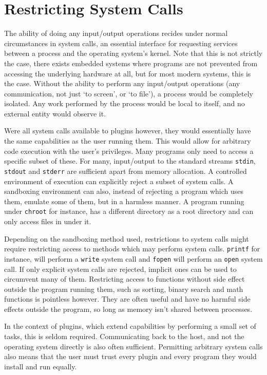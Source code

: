 \section {Restricting System Calls}

The ability of doing any input/output operations recides under normal
circumstances in system calls, an essential interface for requesting services
between a process and the operating system's kernel. Note that this is not
strictly the case, there exists embedded systems where programs are not
prevented from accessing the underlying hardware at all, but for most modern
systems, this is the case. Without the ability to perform any input/output
operations (any communication, not just `to screen', or `to file'), a process
would be completely isolated. Any work performed by the process would be local
to itself, and no external entity would observe it.

Were all system calls available to plugins however, they would essentially
have the same capabilities as the user running them. This would allow for
arbitrary code execution with the user's privileges. Many programs only need to
access a specific subset of these. For many, input/output to the standard
streams \texttt{stdin}, \texttt{stdout} and \texttt{stderr} are sufficient apart
from memory allocation. A controlled environment of execution can explicitly
reject a subset of system calls. A sandboxing environment can also, instead of
rejecting a program which uses them, emulate some of them, but in a harmless
manner. A program running under \texttt{chroot} for instance, has a different
directory as a root directory and can only access files in under it.

Depending on the sandboxing method used, restrictions to system calls might
require restricting access to methods which may perform system calls.
\texttt{printf} for instance, will perform a \texttt{write} system call and
\texttt{fopen} will perform an \texttt{open} system call. If only explicit
system calls are rejected, implicit ones can be used to circumvent many of them.
Restricting access to functions without side effect outside the program running
them, such as sorting, binary search and math functions is pointless however.
They are often useful and have no harmful side effects outside the program, so
long as memory isn't shared between processes.

In the context of plugins, which extend capabilities by performing a small set
of tasks, this is seldom required. Communicating back to the host, and not the
operating system directly is also often sufficient. Permitting arbitrary system
calls also means that the user must trust every plugin and every program they
would install and run equally.

